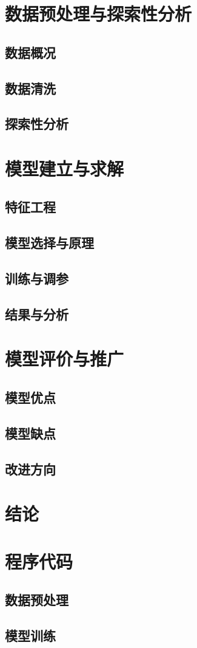 \documentclass[12pt, a4paper]{ctexart}
\begin{document}
\section{数据预处理与探索性分析}
\subsection{数据概况}
\subsection{数据清洗}   %
\subsection{探索性分析} %

\section{模型建立与求解}
\subsection{特征工程}
\subsection{模型选择与原理}
\subsection{训练与调参}
\subsection{结果与分析}

\section{模型评价与推广}
\subsection{模型优点}
\subsection{模型缺点}
\subsection{改进方向}

\section{结论}

\newpage



\newpage
\appendix
\section{程序代码}
\subsection{数据预处理}
\subsection{模型训练}
\end{document}
